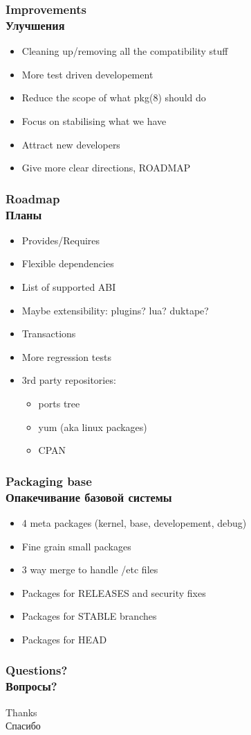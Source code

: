 \begin{frame}
	\frametitle{Improvements \\ Улучшения}
	\begin{itemize}
		\item Cleaning up/removing all the compatibility stuff
		\item More test driven developement
		\item Reduce the scope of what pkg(8) should do
		\item Focus on stabilising what we have
		\item Attract new developers
		\item Give more clear directions, ROADMAP
	\end{itemize}
\end{frame}

\begin{frame}
	\frametitle{Roadmap \\ Планы}
	\begin{itemize}
		\item Provides/Requires
		\item Flexible dependencies
		\item List of supported ABI
		\item Maybe extensibility: plugins? lua? duktape?
		\item Transactions
		\item More regression tests
		\item 3rd party repositories:
			\begin{itemize}
				\item ports tree
				\item yum (aka linux packages)
				\item CPAN
			\end{itemize}
	\end{itemize}
\end{frame}

\begin{frame}
	\frametitle{Packaging base \\ Опакечивание базовой системы}
	\begin{itemize}
		\item 4 meta packages (kernel, base, developement, debug)
		\item Fine grain small packages
		\item 3 way merge to handle /etc files
		\item Packages for RELEASES and security fixes
		\item Packages for STABLE branches
		\item Packages for HEAD
	\end{itemize}
\end{frame}

\begin{frame}[plain]
	\frametitle{Questions? \\ Вопросы?}
	\begin{center}
		\Huge Thanks
		\\
		\Huge Спасибо
	\end{center}
\end{frame}


